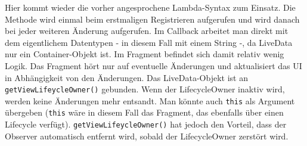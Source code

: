 \begin{Shaded}
\begin{Highlighting}[]
 
      \NormalTok{(} 

 \NormalTok{(}\NormalTok{);}

\NormalTok{(}\NormalTok{(),}
\NormalTok{         \});}
\NormalTok{\}}
\end{Highlighting}
\end{Shaded}

Hier kommt wieder die vorher angesprochene Lambda-Syntax zum Einsatz.
Die Methode wird einmal beim erstmaligen Registrieren aufgerufen und
wird danach bei jeder weiteren Änderung aufgerufen. Im Callback arbeitet
man direkt mit dem eigentlichem Datentypen - in diesem Fall mit einem
String -, da LiveData nur ein Container-Objekt ist. Im Fragment befindet
sich damit relativ wenig Logik. Das Fragment hört nur auf eventuelle
Änderungen und aktualisiert das UI in Abhängigkeit von den Änderungen.
Das LiveData-Objekt ist an \texttt{getViewLifeycleOwner()} gebunden.
Wenn der LifecycleOwner inaktiv wird, werden keine Änderungen mehr
entsandt. Man könnte auch \texttt{this} als Argument übergeben
(\texttt{this} wäre in diesem Fall das Fragment, das ebenfalls über
einen Lifecycle verfügt). \texttt{getViewLifeycleOwner()} hat jedoch den
Vorteil, dass der Observer automatisch entfernt wird, sobald der
LifecycleOwner zerstört wird.

